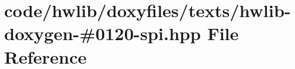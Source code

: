 \hypertarget{hwlib-doxygen-#0120-spi_8hpp}{}\section{code/hwlib/doxyfiles/texts/hwlib-\/doxygen-\/\#0120-\/spi.hpp File Reference}
\label{hwlib-doxygen-#0120-spi_8hpp}
